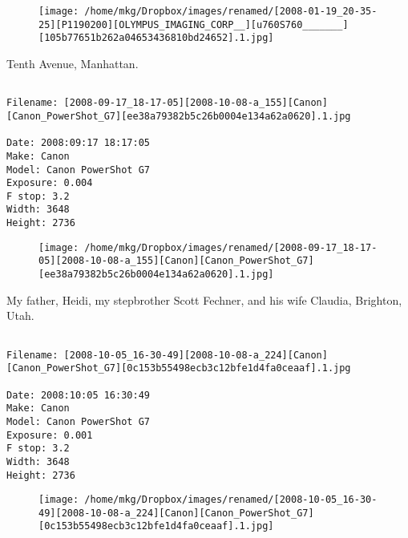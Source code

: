 \begin{figure}
\texttt{[image: /home/mkg/Dropbox/images/renamed/[2008-01-19\_20-35-25][P1190200][OLYMPUS\_IMAGING\_CORP\_\_][u760S760\_\_\_\_\_\_\_][105b77651b262a04653436810bd24652].1.jpg]}
\end{figure}
    
\clearpage
\onecolumn
\noindent Tenth Avenue, Manhattan.
\noindent
\begin{lstlisting}

Filename: [2008-09-17_18-17-05][2008-10-08-a_155][Canon][Canon_PowerShot_G7][ee38a79382b5c26b0004e134a62a0620].1.jpg

Date: 2008:09:17 18:17:05
Make: Canon
Model: Canon PowerShot G7
Exposure: 0.004
F stop: 3.2
Width: 3648
Height: 2736
\end{lstlisting}
\clearpage

\begin{figure}
\texttt{[image: /home/mkg/Dropbox/images/renamed/[2008-09-17\_18-17-05][2008-10-08-a\_155][Canon][Canon\_PowerShot\_G7][ee38a79382b5c26b0004e134a62a0620].1.jpg]}
\end{figure}
    
\clearpage
\onecolumn
\noindent My father, Heidi, my stepbrother Scott Fechner, and his wife Claudia, Brighton, Utah.
\noindent
\begin{lstlisting}

Filename: [2008-10-05_16-30-49][2008-10-08-a_224][Canon][Canon_PowerShot_G7][0c153b55498ecb3c12bfe1d4fa0ceaaf].1.jpg

Date: 2008:10:05 16:30:49
Make: Canon
Model: Canon PowerShot G7
Exposure: 0.001
F stop: 3.2
Width: 3648
Height: 2736
\end{lstlisting}
\clearpage

\begin{figure}
\texttt{[image: /home/mkg/Dropbox/images/renamed/[2008-10-05\_16-30-49][2008-10-08-a\_224][Canon][Canon\_PowerShot\_G7][0c153b55498ecb3c12bfe1d4fa0ceaaf].1.jpg]}
\end{figure}
    
